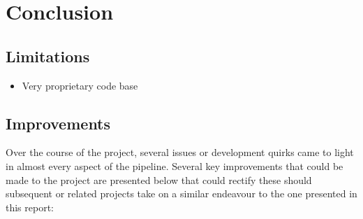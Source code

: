 \documentclass[conference]{IEEEtran}
\begin{document}

\section{Conclusion}
\label{sec:conclusion}

\subsection{Limitations}
\label{subsec:limitations}

\begin{itemize}
    \item Very proprietary code base
\end{itemize}

\subsection{Improvements}

Over the course of the project, several issues or development quirks came to light in almost every aspect of the pipeline. Several key improvements that could be made to the project are presented below that could rectify these should subsequent or related projects take on a similar endeavour to the one presented in this report:
\end{document}
